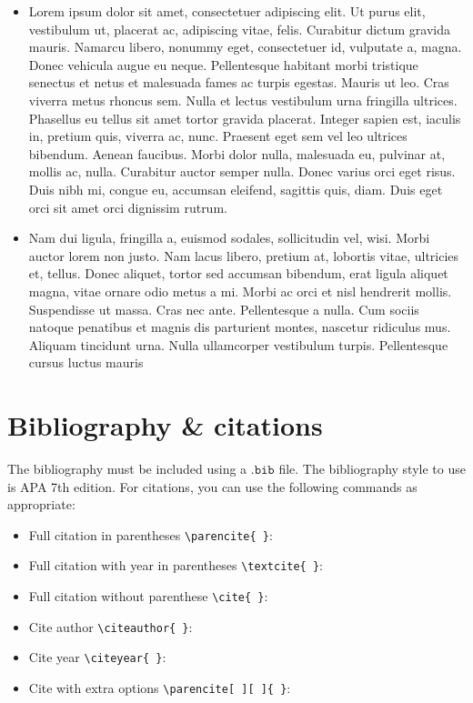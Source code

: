 \documentclass[11pt]{article}
\begin{document}
\begin{itemize}[leftmargin=*]
\item 
    Lorem ipsum dolor sit amet, consectetuer adipiscing elit. Ut purus elit, vestibulum ut, placerat ac, adipiscing vitae, felis. Curabitur dictum gravida mauris. Namarcu libero, nonummy eget, consectetuer id, vulputate a, magna. 
    Donec vehicula augue eu neque. Pellentesque habitant morbi tristique senectus et netus et malesuada fames ac turpis egestas. Mauris ut leo. Cras viverra metus rhoncus sem. Nulla et lectus vestibulum urna fringilla ultrices. Phasellus eu tellus sit amet tortor gravida placerat. Integer sapien est, iaculis in, pretium quis, viverra ac, nunc. Praesent eget sem vel leo ultrices bibendum. Aenean faucibus. Morbi dolor nulla, malesuada eu, pulvinar at, mollis ac, nulla. Curabitur auctor semper nulla. Donec varius orci eget risus. Duis nibh mi, congue eu, accumsan eleifend, sagittis quis, diam. Duis eget orci sit amet orci dignissim rutrum.

\item
    Nam dui ligula, fringilla a, euismod sodales, sollicitudin vel, wisi. Morbi auctor lorem non justo. Nam lacus libero, pretium at, lobortis vitae, ultricies et, tellus. Donec aliquet, tortor sed accumsan bibendum, erat ligula aliquet magna, vitae ornare odio metus a mi. Morbi ac orci et nisl hendrerit mollis. Suspendisse ut massa. Cras nec ante. Pellentesque a nulla. Cum sociis natoque penatibus et magnis dis parturient montes, nascetur ridiculus mus. Aliquam tincidunt urna. Nulla ullamcorper vestibulum turpis. Pellentesque cursus luctus mauris
\end{itemize}



\section{Bibliography \& citations}

The bibliography must be included using a \(\texttt{.bib}\) file. The bibliography style to use is APA 7th edition. For citations, you can use the following commands as appropriate:

\begin{itemize}
\item 
    Full citation in parentheses \verb"\parencite{ }": \parencite{stewartpre}
\item
    Full citation with year in parentheses \verb"\textcite{ }": \textcite{stewartpre}
\item 
    Full citation without parenthese \verb"\cite{ }": \cite{stewartpre}
\item
    Cite author \verb"\citeauthor{ }": \citeauthor{stewartpre}
\item
    Cite year \verb"\citeyear{ }": \citeyear{stewartpre}
\item 
    Cite with extra options \verb"\parencite[ ][ ]{ }": \parencite[ver][p. 66]{stewartpre}
\end{itemize}
\end{document}
